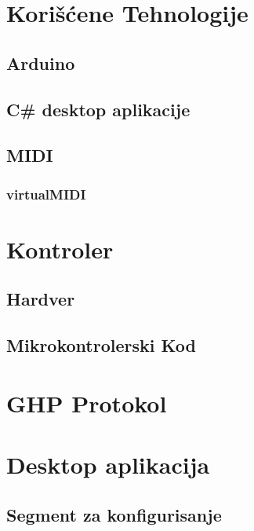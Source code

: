 \documentclass[12pt,oneside]{memoir}
\begin{document}
	\frontmatter

	\naslovna

	\apstrakt
	\tableofcontents*

	\mainmatter

	\chapter{Korišćene Tehnologije}
	
	\section{Arduino}
	
	\section{C\# desktop aplikacije}
	
	\section{MIDI}
	
	\subsection{virtualMIDI}
	
	\chapter{Kontroler}
	
	\section{Hardver}
	
	\section{Mikrokontrolerski Kod}
	
	\chapter{GHP Protokol}
	
	\chapter{Desktop aplikacija}
	
	\section{Segment za konfigurisanje}
\end{document}
